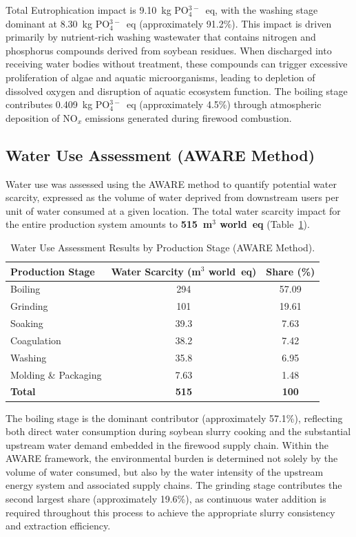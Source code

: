 \documentclass[12pt,a4paper]{article}
\begin{document}
Total Eutrophication impact is 9.10~kg PO$_4^{3-}$~eq, with the washing stage dominant at
8.30~kg PO$_4^{3-}$~eq (approximately 91.2\%). This impact is driven primarily by nutrient-rich
washing wastewater that contains nitrogen and phosphorus compounds derived from soybean residues. When
discharged into receiving water bodies without treatment, these compounds can trigger excessive
proliferation of algae and aquatic microorganisms, leading to depletion of dissolved oxygen and
disruption of aquatic ecosystem function. The boiling stage contributes 0.409~kg PO$_4^{3-}$~eq
(approximately 4.5\%) through atmospheric deposition of NO$_x$ emissions generated during firewood
combustion.



\subsection{Water Use Assessment (AWARE Method)}

Water use was assessed using the AWARE method to quantify potential water scarcity, expressed as the
volume of water deprived from downstream users per unit of water consumed at a given location. The
total water scarcity impact for the entire production system amounts to \textbf{515~m$^3$ world~eq}
(Table~\ref{tab:aware}).

\begin{table}[H]
\centering
\caption{Water Use Assessment Results by Production Stage (AWARE Method).}
\label{tab:aware}
\small
\begin{tabular}{lcc}
\toprule
\textbf{Production Stage} & \textbf{Water Scarcity (m$^3$ world~eq)} & \textbf{Share (\%)}\\
\midrule
Boiling               & 294   & 57.09 \\
Grinding              & 101   & 19.61 \\
Soaking               & 39.3  & 7.63  \\
Coagulation           & 38.2  & 7.42  \\
Washing               & 35.8  & 6.95  \\
Molding \& Packaging  & 7.63  & 1.48  \\
\midrule
\textbf{Total}        & \textbf{515} & \textbf{100} \\
\bottomrule
\end{tabular}
\end{table}

The boiling stage is the dominant contributor (approximately 57.1\%), reflecting both direct water
consumption during soybean slurry cooking and the substantial upstream water demand embedded in the
firewood supply chain. Within the AWARE framework, the environmental burden is determined not solely by
the volume of water consumed, but also by the water intensity of the upstream energy system and
associated supply chains. The grinding stage contributes the second largest share (approximately
19.6\%), as continuous water addition is required throughout this process to achieve the appropriate
slurry consistency and extraction efficiency.
\end{document}
